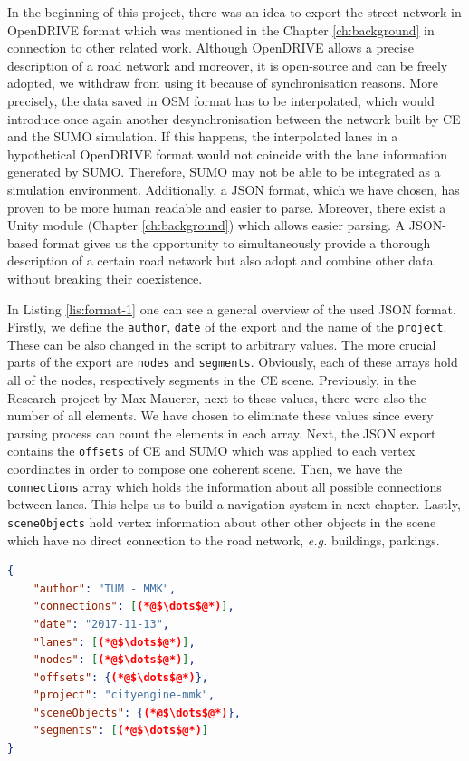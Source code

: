 In the beginning of this project, there was an idea to export the street network in OpenDRIVE format which was mentioned in the Chapter \ref{ch:background} in connection to other related work. Although OpenDRIVE allows a precise description of a road network and moreover, it is open-source and can be freely adopted, we withdraw from using it because of synchronisation reasons. More precisely, the data saved in OSM format has to be interpolated\cite{shi2011automatic}, which would introduce once again another desynchronisation between the network built by CE and the SUMO simulation. If this happens, the interpolated lanes in a hypothetical OpenDRIVE format would not coincide with the lane information generated by SUMO. Therefore, SUMO may not be able to be integrated as a simulation environment. Additionally, a JSON format, which we have chosen, has proven to be more human readable and easier to parse. Moreover, there exist a Unity module (Chapter \ref{ch:background}) which allows easier parsing. A JSON-based format gives us the opportunity to simultaneously provide a thorough description of a certain road network but also adopt and combine other data without breaking their coexistence. 

In Listing \ref{lis:format-1} one can see a general overview of the used JSON format. Firstly, we define the \texttt{author}, \texttt{date} of the export and the name of the \texttt{project}. These can be also changed in the script to arbitrary values. The more crucial parts of the export are \texttt{nodes} and \texttt{segments}. Obviously, each of these arrays hold all of the nodes, respectively segments in the CE scene. Previously, in the Research project by Max Mauerer, next to these values, there were also the number of all elements. We have chosen to eliminate these values since every parsing process can count the elements in each array. Next, the JSON export contains the \texttt{offsets} of CE and SUMO which was applied to each vertex coordinates in order to compose one coherent scene. Then, we have the \texttt{connections} array which holds the information about all possible connections between lanes. This helps us to build a navigation system in next chapter. Lastly, \texttt{sceneObjects} hold vertex information about other other objects in the scene which have no direct connection to the road network, \emph{e.g.} buildings, parkings.\\

    \begin{scriptsize}
	   \begin{lstlisting}[language=json,firstnumber=1,caption={General overview of the used JSON format for description of road networks.},label={lis:format-1}]
{
    "author": "TUM - MMK",
    "connections": [(*@$\dots$@*)],
    "date": "2017-11-13",
    "lanes": [(*@$\dots$@*)],
    "nodes": [(*@$\dots$@*)],
    "offsets": {(*@$\dots$@*)},
    "project": "cityengine-mmk",
    "sceneObjects": {(*@$\dots$@*)},
    "segments": [(*@$\dots$@*)]
}
	   \end{lstlisting}
    \end{scriptsize}

